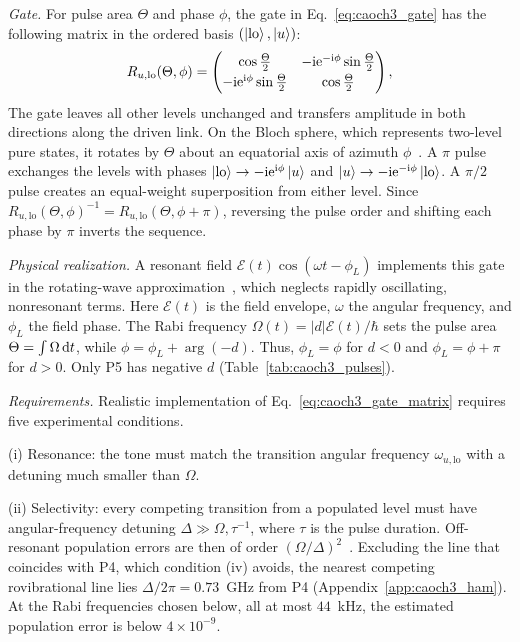 \emph{Gate.} For pulse area $\Theta$ and phase $\phi$, the gate in Eq.~\eqref{eq:caoch3_gate} has the following matrix in the ordered basis $(\ket{\mathrm{lo}},\ket{u})$:
\begin{equation}
R_{u,\mathrm{lo}}(\Theta,\phi)=\begin{pmatrix}\cos\tfrac\Theta2&-\mathrm{i}\mathrm{e}^{-\mathrm{i}\phi}\sin\tfrac\Theta2\\[2pt]-\mathrm{i}\mathrm{e}^{\mathrm{i}\phi}\sin\tfrac\Theta2&\cos\tfrac\Theta2\end{pmatrix},
\label{eq:caoch3_gate_matrix}
\end{equation}
The gate leaves all other levels unchanged and transfers amplitude in both directions along the driven link. On the Bloch sphere, which represents two-level pure states, it rotates by $\Theta$ about an equatorial axis of azimuth $\phi$~\cite{AllenEberly1975,Nielsen_Chuang_2010}. A $\pi$ pulse exchanges the levels with phases $\ket{\mathrm{lo}}\to-\mathrm{i}\mathrm{e}^{\mathrm{i}\phi}\ket{u}$ and $\ket{u}\to-\mathrm{i}\mathrm{e}^{-\mathrm{i}\phi}\ket{\mathrm{lo}}$. A $\pi/2$ pulse creates an equal-weight superposition from either level. Since $R_{u,\mathrm{lo}}(\Theta,\phi)^{-1}=R_{u,\mathrm{lo}}(\Theta,\phi+\pi)$, reversing the pulse order and shifting each phase by $\pi$ inverts the sequence.

\emph{Physical realization.} A resonant field $\mathcal E(t)\cos(\omega t-\phi_L)$ implements this gate in the rotating-wave approximation~\cite{AllenEberly1975}, which neglects rapidly oscillating, nonresonant terms. Here $\mathcal E(t)$ is the field envelope, $\omega$ the angular frequency, and $\phi_L$ the field phase. The Rabi frequency $\Omega(t)=|d|\mathcal E(t)/\hbar$ sets the pulse area $\Theta=\int\Omega\,\mathrm{d} t$, while $\phi=\phi_L+\arg(-d)$. Thus, $\phi_L=\phi$ for $d<0$ and $\phi_L=\phi+\pi$ for $d>0$. Only P5 has negative $d$ (Table~\ref{tab:caoch3_pulses}).

\emph{Requirements.} Realistic implementation of Eq.~\eqref{eq:caoch3_gate_matrix} requires five experimental conditions.

(i) Resonance: the tone must match the transition angular frequency $\omega_{u,\mathrm{lo}}$ with a detuning much smaller than $\Omega$.

(ii) Selectivity: every competing transition from a populated level must have angular-frequency detuning $\Delta\gg\Omega,\tau^{-1}$, where $\tau$ is the pulse duration. Off-resonant population errors are then of order $(\Omega/\Delta)^2$~\cite{AllenEberly1975}. Excluding the line that coincides with P4, which condition (iv) avoids, the nearest competing rovibrational line lies $\Delta/2\pi=0.73$~GHz from P4 (Appendix~\ref{app:caoch3_ham}). At the Rabi frequencies chosen below, all at most $44$~kHz, the estimated population error is below $4\times10^{-9}$.

